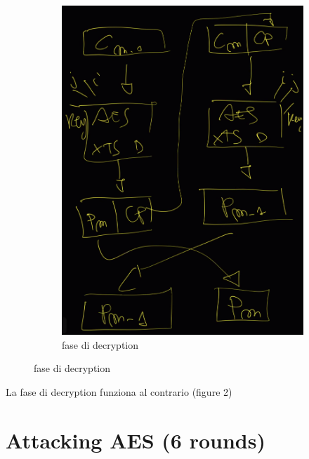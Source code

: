 \documentclass[11pt, oneside]{article}   	%
\begin{document}
\begin{figure}[H]
\begin{subfigure}[h]{0.4\linewidth}
\includegraphics[width=\linewidth]{cpo-1}
\caption*{fase di decryption}
\end{subfigure}%
\end{figure}
La fase di decryption funziona al contrario (figure 2)

\section*{Attacking AES (6 rounds)}
\end{document}
